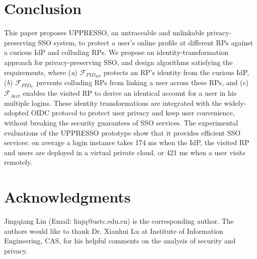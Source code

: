 \section{Conclusion}
\label{sec:conclusion}
This paper proposes UPPRESSO, an untraceable and unlinkable privacy-preserving SSO system,
 to protect a user's online profile at different RPs against a curious IdP and colluding RPs.
We propose an identity-transformation approach for privacy-preserving SSO,
 and design algorithms satisfying the requirements,
 where (\emph{a}) $\mathcal{F}_{PID_{RP}}$ protects an RP's identity from the curious IdP,
(\emph{b})  $\mathcal{F}_{PID_{U}}$ prevents colluding RPs from linking a user across these RPs,
 and (\emph{c}) $\mathcal{F}_{Acct}$ enables the visited RP to derive an identical account for a user in his multiple logins.
These identity transformations are integrated with the widely-adopted OIDC protocol
    to protect user privacy and keep user convenience,
    without breaking the security guarantees of SSO services.
The experimental evaluations of the UPPRESSO prototype show
 that it provides efficient SSO services:
  on average a login instance takes 174 ms when the IdP, the visited RP and users are deployed in a virtual private cloud, or 421 ms when a user visits remotely.

\section*{Acknowledgments}
Jingqiang Lin (Email: linjq@ustc.edu.cn) is the corresponding author.
The authors would like to thank Dr. Xianhui Lu at Institute of Information Engineering, CAS,
    for his helpful comments on the analysis of security and privacy.
